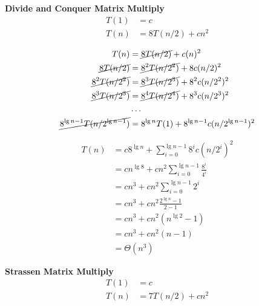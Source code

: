 \documentclass{article}
\begin{document}
 
\LARGE

{\bf Divide and Conquer Matrix Multiply}
\begin{align*}
  T(1) &= c\\
  T(n) &= 8T(n/2) + cn^2
\end{align*}

\begin{align*}
  T(n) &= \cancel{8T(n/2)} + c(n)^2\\
  \cancel{8T(n/2)} &= \cancel{8^2T(n/2^2)} + 8c(n/2)^2 \\
  \cancel{8^2T(n/2^2)} &= \cancel{8^3T(n/2^3)} + 8^2c(n/2^2)^2\\
  \cancel{8^3T(n/2^3)} &= \cancel{8^4T(n/2^4)} + 8^3c(n/2^3)^2\\
  &\ldots\\
  \cancel{8^{\lg n - 1}T(n/2^{\lg n - 1})} &= 8^{\lg n}T(1) + 8^{\lg n - 1}c(n/2^{\lg n - 1})^2
  \end{align*}

\begin{align*}
  T(n) &=  c8^{\lg n} + \sum_{i=0}^{\lg n -1}8^ic(n/2^{i})^2\\
  &=   cn^{\lg 8} + cn^2\sum_{i=0}^{\lg n -1}\frac{8^i}{4^i}\\
  &=   cn^3 + cn^2\sum_{i=0}^{\lg n -1}2^i\\
  &=   cn^3 + cn^2\frac{2^{\lg n} - 1}{2-1}\\
  &=   cn^3 + cn^2(n^{\lg 2} - 1)\\
  &=   cn^3 + cn^2(n - 1)\\
  &= \Theta(n^3)
  \end{align*}

{\bf Strassen Matrix Multiply}
\begin{align*}
  T(1) &= c\\
  T(n) &= 7T(n/2) + cn^2
\end{align*}
\end{document}
